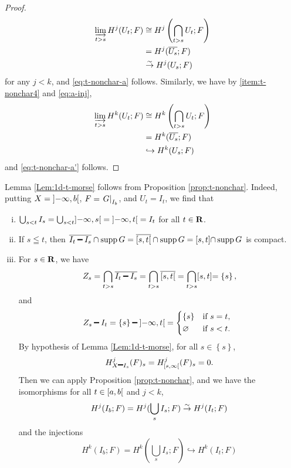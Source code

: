 \begin{proof}
\begin{align*}
    \indlim[t>s]H^{j}(U_t;F)
    &\cong 
    H^{j}\left(\bigcap_{t>s}U_t;F\right)\\
    &=
    H^{j}(\overline{U_s};F)\\
    &\simar
    H^{j}(U_s;F)
  \end{align*}
  for any \(j<k\), and \ref{eq:t-nonchar-a} follows. 
  Similarly, 
  we have by \eqref{item:t-nonchar4} and \eqref{eq:a-inj},
    \begin{align*}
    \indlim[t>s]H^{k}(U_t;F)
    &\cong 
    H^{k}\left(\bigcap_{t>s}U_t;F\right)\\
    &=
    H^{k}(\overline{U_s};F)\\
    &\hookrightarrow
    H^{k}(U_s;F)
  \end{align*}
  and \ref{eq:t-nonchar-a'} follows.
\end{proof}













\clearpage
\begin{Remark+}
  Lemma \ref{Lem:1d-t-morse} follows from 
  Proposition \ref{prop:t-nonchar}. 
  Indeed, putting \(X=\lopen-\infty,b\ropen\), 
  \(F=\mres[G]{I_{b}}\), and \(U_t=I_t\), 
  we find that \begin{enumerate}[(i)]
    \item \(\bigcup_{s<t} I_s
    = \bigcup_{s<t}\lopen-\infty,s\ropen
    = \lopen-\infty,t\ropen= I_t\) for all \(t\in\rr\). 
    \item If \(s\leqq t\), then \(
      \overline{I_t\smi I_s}\cap\supp{G}
      =\overline{\lclosed s,t\ropen}\cap\supp{G}
      =\lclosed s,t\rclosed\cap\supp{G}
      \) is compact.
    \item For \(s\in\rr\), we have \[
      Z_{s}
      =\bigcap_{t>s}\overline{I_{t}\smi I_{s}}
      =\bigcap_{t>s}\overline{\lclosed s,t\ropen}
      =\bigcap_{t>s}\lclosed s,t\rclosed
      =\left\{s\right\},
    \]
    and \[
      Z_s\smi I_t
      =\left\{s\right\}\smi \lopen-\infty,t\ropen
      =\begin{cases*}
        \left\{s\right\}& if \(s=t\),\\
        \varnothing& if \(s<t\).
      \end{cases*}
    \]
    By hypothesis of Lemma \ref{Lem:1d-t-morse}, 
    for all \(s\in \left\{s\right\}\), 
    \[
      H^{j}_{X\smi I_s}(F)_{s}
      =H^{j}_{\lclosed s,\infty\ropen}(F)_{s}=0.
    \]
    Then we can apply Proposition \ref{prop:t-nonchar}, and 
    we have the isomorphisms for all \(t\in \lclosed a,b\ropen\) and \(j<k\),
    \[
      H^{j}(I_{b};F)
      =H^{j}(\bigcup_{s}I_{s};F)
      \simar
      H^{j}(I_{t};F)
    \]
    and the injections
    \[
      H^{k}(I_{b};F)
      =H^{k}(\bigcup_{s}I_{s};F)
      \hookrightarrow
      H^{k}(I_{t};F)
    \]
  \end{enumerate}
\end{Remark+}


